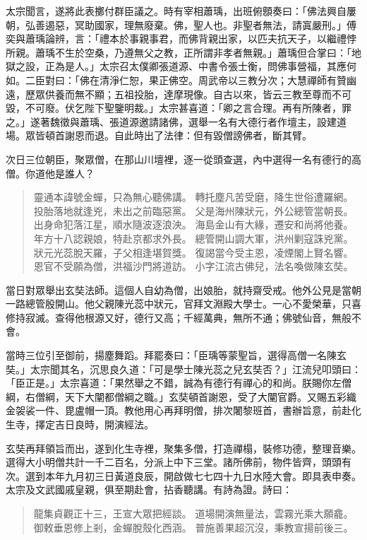 太宗聞言，遂將此表擲付群臣議之。時有宰相蕭瑀，出班俯顖奏曰：「佛法興自屢朝，弘善遏惡，冥助國家，理無廢棄。佛，聖人也。非聖者無法，請寘嚴刑。」傅奕與蕭瑀論辨，言：「禮本於事親事君，而佛背親出家，以匹夫抗天子，以繼禮悖所親。蕭瑀不生於空桑，乃遵無父之教，正所謂非孝者無親。」蕭瑀但合掌曰：「地獄之設，正為是人。」太宗召太僕卿張道源、中書令張士衡，問佛事營福，其應何如。二臣對曰：「佛在清淨仁恕，果正佛空。周武帝以三教分次；大慧禪師有贊幽遠，歷眾供養而無不顯；五祖投胎，達摩現像。自古以來，皆云三教至尊而不可毀，不可廢。伏乞陛下聖鑒明裁。」太宗甚喜道：「卿之言合理。再有所陳者，罪之。」遂著魏徵與蕭瑀、張道源邀請諸佛，選舉一名有大德行者作壇主，設建道場。眾皆頓首謝恩而退。自此時出了法律：但有毀僧謗佛者，斷其臂。

次日三位朝臣，聚眾僧，在那山川壇裡，逐一從頭查選，內中選得一名有德行的高僧。你道他是誰人？
\begin{quote}
靈通本諱號金蟬，只為無心聽佛講。
轉托塵凡苦受磨，降生世俗遭羅網。
投胎落地就逢兇，未出之前臨惡黨。
父是海州陳狀元，外公總管當朝長。
出身命犯落江星，順水隨波逐浪泱。
海島金山有大緣，遷安和尚將他養。
年方十八認親娘，特赴京都求外長。
總管開山調大軍，洪州剿寇誅兇黨。
狀元光蕊脫天羅，子父相逢堪賀獎。
復謁當今受主恩，凌煙閣上賢名響。
恩官不受願為僧，洪福沙門將道訪。
小字江流古佛兒，法名喚做陳玄奘。
\end{quote}

當日對眾舉出玄奘法師。這個人自幼為僧，出娘胎，就持齋受戒。他外公見是當朝一路總管殷開山。他父親陳光蕊中狀元，官拜文淵殿大學士。一心不愛榮華，只喜修持寂滅。查得他根源又好，德行又高；千經萬典，無所不通；佛號仙音，無般不會。

當時三位引至御前，揚塵舞蹈。拜罷奏曰：「臣瑀等蒙聖旨，選得高僧一名陳玄奘。」太宗聞其名，沉思良久道：「可是學士陳光蕊之兒玄奘否？」江流兒叩頭曰：「臣正是。」太宗喜道：「果然舉之不錯，誠為有德行有禪心的和尚。朕賜你左僧綱，右僧綱，天下大闡都僧綱之職。」玄奘頓首謝恩，受了大闡官爵。又賜五彩織金袈裟一件、毘盧帽一頂。教他用心再拜明僧，排次闍黎班首，書辦旨意，前赴化生寺，擇定吉日良時，開演經法。

玄奘再拜領旨而出，遂到化生寺裡，聚集多僧，打造禪榻，裝修功德，整理音樂。選得大小明僧共計一千二百名，分派上中下三堂。諸所佛前，物件皆齊，頭頭有次。選到本年九月初三日黃道良辰，開啟做七七四十九日水陸大會。即具表申奏。太宗及文武國戚皇親，俱至期赴會，拈香聽講。有詩為證。詩曰：
\begin{quote}
龍集貞觀正十三，王宣大眾把經談。
道場開演無量法，雲霧光乘大願龕。
御敕垂恩修上剎，金蟬脫殼化西涵。
普施善果超沉沒，秉教宣揚前後三。
\end{quote}

